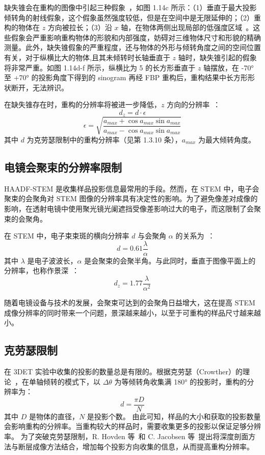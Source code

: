 缺失锥会在重构的图像中引起三种假象~\cite{Kovacik2014}，如图 1.14c 所示：（1）垂直于最大投影倾转角的射线假象，这个假象虽然强度较低，但是在空间中是无限延伸的；（2）重构的物体在 $z$ 方向被拉长；（3）沿 $x$ 轴，在物体两侧出现局部的低强度区域~\cite{Gontard2015}。这些假象会严重影响重构物体的形貌和内部强度，妨碍对三维物体尺寸和形貌的精确测量。此外，缺失锥假象的严重程度，还与物体的外形与倾转角度之间的空间位置有关，对于纵横比大的物体,且其未倾转时长轴垂直于 $z$ 轴时，缺失锥引起的假象将非常严重。如图 1.14d-f 所示，纵横比为 5 的长方形垂直于 $z$ 轴摆放，在 -70° 至 +70° 的投影角度下得到的 sinogram 再经 FBP 重构后，重构结果中长方形形状断开，无法辨识。

在缺失锥存在时，重构的分辨率将被进一步降低，$z$ 方向的分辨率~\cite{Frank2006}：
\begin{equation}
d_z =d\cdot \epsilon
\end{equation}
\begin{equation}
\epsilon=\sqrt{\frac{a_{max}+\cos a_{max}\sin a_{max}}{a_{max}-\cos a_{max} \sin a_{max}}}
\end{equation}
其中 $d$ 为克劳瑟限制中的重构分辨率（见第 1.3.10 条），$a_{max}$ 为最大倾转角度。

\subsection{电镜会聚束的分辨率限制}
HAADF-STEM 是收集样品投影信息最常用的手段。然而，在 STEM 中，电子会聚束的会聚角对 STEM 图像的分辨率具有决定性的影响。为了避免像差对成像的影响，在透射电镜中使用聚光镜光阑遮挡受像差影响过大的电子，而这限制了会聚束的会聚角。

在 STEM 中，电子束束斑的横向分辨率 $d$ 与会聚角 $\alpha$ 的关系为~\cite{Ishikawa2015}：
\begin{equation}
d=0.61\frac{\lambda}{\alpha}
\end{equation}
其中 $\lambda$ 是电子波波长，$\alpha$ 是会聚束的会聚半角。与此同时，垂直于图像平面上的分辨率，也称作景深~\cite{Nellist2007}：
\begin{equation}
d_z=1.77\frac{\lambda}{\alpha^2}
\end{equation}

随着电镜设备与技术的发展，会聚束可达到的会聚角日益增大，这在提高 STEM 成像分辨率的同时带来一个问题，景深越来越小，以至于可重构的样品尺寸越来越小。

\subsection{克劳瑟限制}
在 3DET 实验中收集的投影的数量总是有限的。根据克劳瑟（Crowther）的理论~\cite{Crowther1970}，在单轴倾转的模式下，以 $\Delta \theta$ 为等倾转角收集满 180° 的投影时，重构的分辨率为：
\begin{equation}
d=\frac{\pi D}{N}
\end{equation}
其中 $D$ 是物体的直径，$N$ 是投影个数。
由此可知，样品的大小和获取的投影数量会影响重构的分辨率。当重构较大的样品时，需要收集更多的投影以保证足够分辨率。
为了突破克劳瑟限制，R. Hovden 等~\cite{Hovden2014}和 C. Jacobsen 等~\cite{Jacobsen2018}提出将深度剖面方法与断层成像方法结合，增加每个投影方向收集的信息，从而提高重构分辨率。

